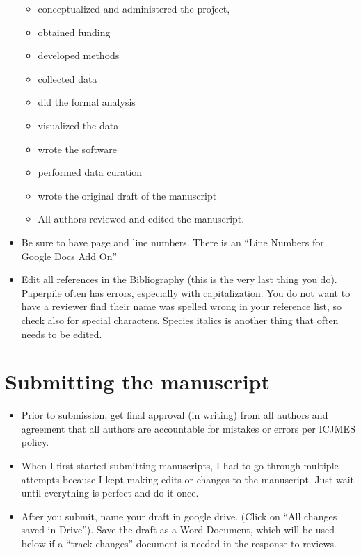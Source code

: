 \documentclass[
  letterpaper,
  DIV=11,
  numbers=noendperiod]{scrreprt}
\begin{document}
\begin{itemize}
  \begin{itemize}
  \item
    conceptualized and administered the project,
  \item
    obtained funding
  \item
    developed methods
  \item
    collected data
  \item
    did the formal analysis
  \item
    visualized the data
  \item
    wrote the software
  \item
    performed data curation
  \item
    wrote the original draft of the manuscript
  \item
    All authors reviewed and edited the manuscript.
  \end{itemize}
\item
  Be sure to have page and line numbers. There is an ``Line Numbers for
  Google Docs Add On''
\item
  Edit all references in the Bibliography (this is the very last thing
  you do). Paperpile often has errors, especially with capitalization.
  You do not want to have a reviewer find their name was spelled wrong
  in your reference list, so check also for special characters. Species
  italics is another thing that often needs to be edited.
\end{itemize}

\hypertarget{submitting-the-manuscript}{%
\section*{\texorpdfstring{\textbf{Submitting the
manuscript}}{Submitting the manuscript}}\label{submitting-the-manuscript}}

\begin{itemize}
\item
  Prior to submission, get final approval (in writing) from all authors
  and agreement that all authors are accountable for mistakes or errors
  per ICJMES policy.
\item
  When I first started submitting manuscripts, I had to go through
  multiple attempts because I kept making edits or changes to the
  manuscript. Just wait until everything is perfect and do it once.
\item
  After you submit, name your draft in google drive. (Click on ``All
  changes saved in Drive''). Save the draft as a Word Document, which
  will be used below if a ``track changes'' document is needed in the
  response to reviews.
\end{itemize}
\end{document}
